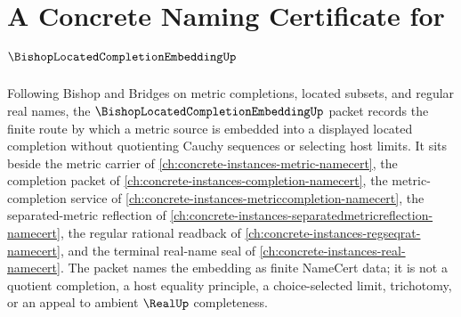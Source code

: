 \chapter{A Concrete Naming Certificate for $\BishopLocatedCompletionEmbeddingUp$}
\label{ch:concrete-instances-bishop-located-completion-embedding-namecert}

Following Bishop and Bridges on metric completions, located subsets, and regular real names, the $\BishopLocatedCompletionEmbeddingUp$ packet records the finite route by which a metric source is embedded into a displayed located completion without quotienting Cauchy sequences or selecting host limits. It sits beside the metric carrier of \autoref{ch:concrete-instances-metric-namecert}, the completion packet of \autoref{ch:concrete-instances-completion-namecert}, the metric-completion service of \autoref{ch:concrete-instances-metriccompletion-namecert}, the separated-metric reflection of \autoref{ch:concrete-instances-separatedmetricreflection-namecert}, the regular rational readback of \autoref{ch:concrete-instances-regseqrat-namecert}, and the terminal real-name seal of \autoref{ch:concrete-instances-real-namecert}. The packet names the embedding as finite NameCert data; it is not a quotient completion, a host equality principle, a choice-selected limit, trichotomy, or an appeal to ambient $\RealUp$ completeness.

